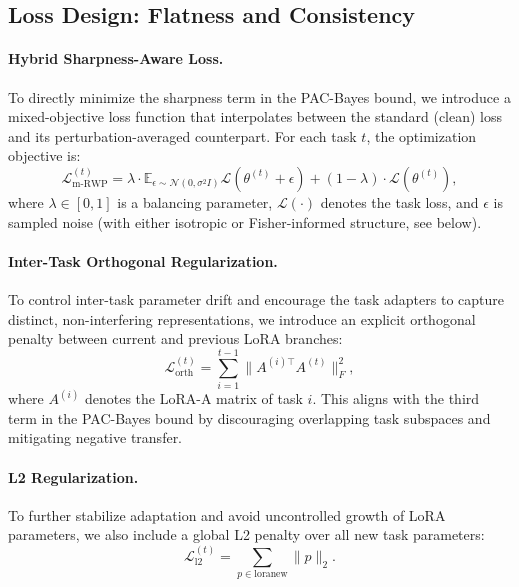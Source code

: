 \documentclass[letterpaper]{article} %
\begin{document}
\subsection{Loss Design: Flatness and Consistency}

\paragraph{Hybrid Sharpness-Aware Loss.}
To directly minimize the sharpness term in the PAC-Bayes bound, we introduce a mixed-objective loss function that interpolates between the standard (clean) loss and its perturbation-averaged counterpart. For each task $t$, the optimization objective is:
\begin{equation}
\label{eq:mrwp-loss}
\mathcal{L}_{\mathrm{m\text{-}RWP}}^{(t)} = \lambda \cdot \mathbb{E}_{\epsilon \sim \mathcal{N}(0, \sigma^2 I)} \mathcal{L}(\theta^{(t)} + \epsilon) + (1 - \lambda) \cdot \mathcal{L}(\theta^{(t)}),
\end{equation}
where $\lambda \in [0,1]$ is a balancing parameter, $\mathcal{L}(\cdot)$ denotes the task loss, and $\epsilon$ is sampled noise (with either isotropic or Fisher-informed structure, see below).

\paragraph{Inter-Task Orthogonal Regularization.}
To control inter-task parameter drift and encourage the task adapters to capture distinct, non-interfering representations, we introduce an explicit orthogonal penalty between current and previous LoRA branches:
\begin{equation}
\label{eq:orth_loss}
\mathcal{L}_{\text{orth}}^{(t)} = \sum_{i=1}^{t-1} \|A^{(i)\top} A^{(t)}\|_F^2,
\end{equation}
where $A^{(i)}$ denotes the LoRA-A matrix of task $i$. This aligns with the third term in the PAC-Bayes bound by discouraging overlapping task subspaces and mitigating negative transfer.

\paragraph{L2 Regularization.}
To further stabilize adaptation and avoid uncontrolled growth of LoRA parameters, we also include a global L2 penalty over all new task parameters:
\begin{equation}
\mathcal{L}_{\text{l2}}^{(t)} = \sum_{p \in \mathrm{loranew}} \|p\|_2.
\end{equation}
\end{document}
